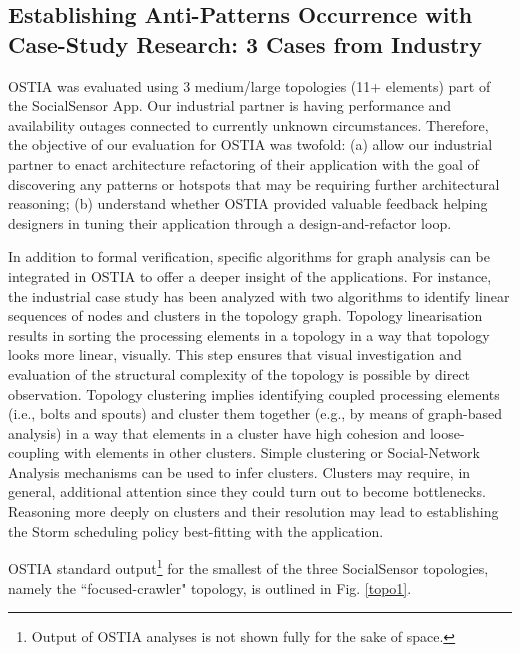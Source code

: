 \documentclass[smallextended]{svjour3}       %
\begin{document}
\subsection{Establishing Anti-Patterns Occurrence with Case-Study Research: 3 Cases from Industry}\label{cs}

OSTIA was evaluated using 3 medium/large topologies (11+ elements) part of the SocialSensor App. Our industrial partner is having
performance and availability outages connected to currently unknown
circumstances. Therefore, the objective of our evaluation for OSTIA was twofold:
(a) allow our industrial partner to enact architecture refactoring of their
application with the goal of discovering any patterns or hotspots that may be
requiring further architectural reasoning; (b) understand whether OSTIA provided
valuable feedback helping designers in tuning their application through a design-and-refactor loop.%


In addition to formal verification, specific algorithms for graph analysis can be integrated in OSTIA to offer a deeper insight of the applications.
For instance, the industrial case study has been analyzed with two algorithms to identify linear sequences of nodes and clusters in the topology graph.
Topology linearisation results in sorting the processing elements in a topology in a way that topology looks more linear, visually. 
This step ensures that visual investigation and evaluation of the structural complexity of the topology is possible by direct observation. 
Topology clustering implies identifying coupled processing elements (i.e., bolts and spouts) and cluster them together (e.g., by means of graph-based analysis) in a way that elements in a cluster have high cohesion and loose-coupling with elements in other clusters. 
Simple clustering or Social-Network Analysis mechanisms can be used to infer clusters. 
Clusters may require, in general, additional attention since they could turn out to become bottlenecks. 
Reasoning more deeply on clusters and their resolution may lead to establishing the Storm scheduling policy best-fitting with the application.


OSTIA standard output\footnote{Output of OSTIA analyses is not shown fully for the
sake of space.} for the smallest of the three SocialSensor topologies, namely
the ``focused-crawler" topology, is outlined in Fig. \ref{topo1}.
\end{document}
